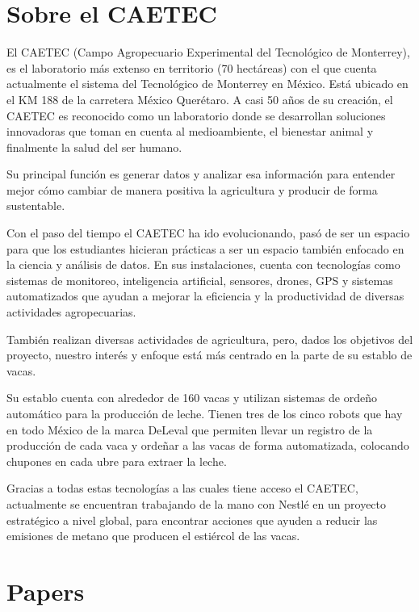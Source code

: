 \documentclass[11pt,letterpaper,DIV=12]{scrartcl}
\begin{document}


\section{Sobre el CAETEC}

El CAETEC (Campo Agropecuario Experimental del Tecnológico de Monterrey), es el laboratorio más extenso en territorio (70 hectáreas) con el que cuenta actualmente el sistema del Tecnológico de Monterrey en México. Está ubicado en el KM 188 de la carretera México Querétaro. A casi 50 años de su creación, el CAETEC es reconocido como un laboratorio donde se desarrollan soluciones innovadoras que toman en cuenta al medioambiente, el bienestar animal y finalmente la salud del ser humano.

Su principal función es generar datos y analizar esa información para entender mejor cómo cambiar de manera positiva la agricultura y producir de forma sustentable.

Con el paso del tiempo el CAETEC ha ido evolucionando, pasó de ser un espacio para que los estudiantes hicieran prácticas a ser un espacio también enfocado en la ciencia y análisis de datos. En sus instalaciones, cuenta con tecnologías como sistemas de monitoreo, inteligencia artificial, sensores, drones, GPS y sistemas automatizados que ayudan a mejorar la eficiencia y la productividad de diversas actividades agropecuarias.

También realizan diversas actividades de agricultura, pero, dados los objetivos del proyecto, nuestro interés y enfoque está más centrado en la parte de su establo de vacas.

Su establo cuenta con alrededor de 160 vacas y utilizan sistemas de ordeño automático para la producción de leche. Tienen tres de los cinco robots que hay en todo México de la marca DeLeval que permiten llevar un registro de la producción de cada vaca y ordeñar a las vacas de forma automatizada, colocando chupones en cada ubre para extraer la leche.

Gracias a todas estas tecnologías a las cuales tiene acceso el CAETEC, actualmente se encuentran trabajando de la mano con Nestlé en un proyecto estratégico a nivel global, para encontrar acciones que ayuden a reducir las emisiones de metano que producen el estiércol de las vacas.

\section{Papers}
\end{document}
